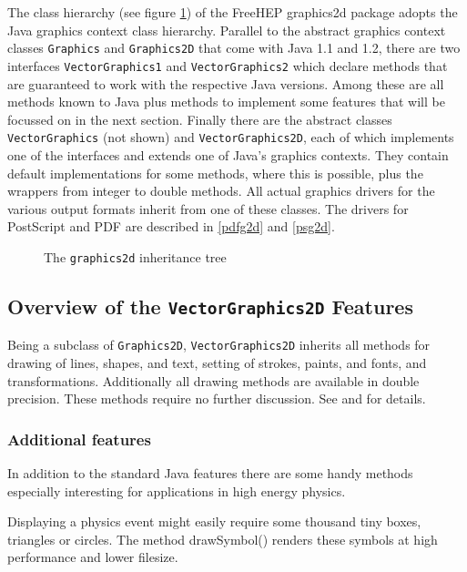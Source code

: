 \documentclass[a4paper]{article}
\newcommand{\freehep}{\textsf{FreeHEP}}
\newcommand{\class}[1]{\texttt{#1}}
\newcommand{\fhclass}[1]{\class{#1}}
\newcommand{\method}[1]{\textsf{#1}}
\newcommand{\ps}{PostScript}
\newcommand{\pdf}{PDF}
\begin{document}
The class hierarchy (see figure \ref{classes}) of the \freehep{} graphics2d package adopts the
Java graphics context class hierarchy. Parallel to the abstract graphics context
classes \class{Graphics} and \class{Graphics2D} that come with Java
1.1 and 1.2, there are two interfaces \fhclass{VectorGraphics1} and
\fhclass{VectorGra\-phics2} which declare methods that are guaranteed to
work with the respective Java versions. Among these are all methods
known to Java plus methods to implement some features that will be focussed on in the
next section. Finally there are the abstract classes
\fhclass{VectorGraphics} (not shown) and \fhclass{VectorGraphics2D},
each of which implements one of the interfaces and extends one of
Java's graphics contexts. They contain default implementations for
some methods, where this is possible, plus the wrappers from integer
to double methods. All actual graphics drivers for the various output
formats inherit from one of these classes. The drivers for \ps{} and
\pdf{} are described in \ref{pdfg2d} and \ref{psg2d}.

\begin{figure}[htbo]
\caption{The \fhclass{graphics2d} inheritance tree}
\label{classes}
\end{figure}


\subsection{Overview of the \fhclass{VectorGraphics2D} Features}

Being a subclass of \class{Graphics2D}, \fhclass{VectorGraphics2D}
inherits all methods for drawing of lines, shapes, and text,
setting of strokes, paints, and fonts, and transformations. Additionally
all drawing methods are available in double precision. These methods
require no further discussion. See \cite{java2d} and \cite{javaapi}
for details.

\subsubsection{Additional features}

In addition to the standard Java features there are some handy
methods especially interesting for applications in high energy
physics.

Displaying a physics event might easily require some thousand tiny
boxes, triangles or circles. The method \method{drawSymbol()} renders
these symbols at high performance and lower filesize.
\end{document}
